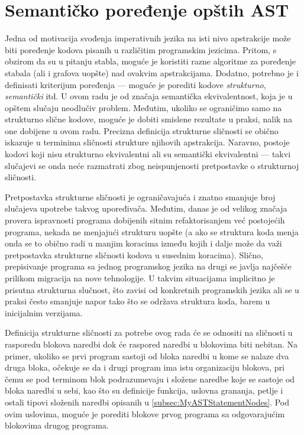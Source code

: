 \chapter{Semantičko poređenje opštih AST}
\label{chp:ASTComparing}

Jedna od motivacija svođenja imperativnih jezika na isti nivo apstrakcije može biti poređenje kodova pisanih u različitim programskim jezicima. Pritom, s obzirom da su u pitanju stabla, moguće je koristiti razne algoritme za poređenje stabala (ali i grafova uopšte) nad ovakvim apstrakcijama. Dodatno, potrebno je i definisati kriterijum poređenja --- moguće je porediti kodove \emph{strukturno}, \emph{semantički} itd. U ovom radu je od značaja semantička ekvivalentnost, koja je u opštem slučaju neodlučiv problem. Međutim, ukoliko se ograničimo samo na strukturno slične kodove, moguće je dobiti smislene rezultate u praksi, nalik na one dobijene u ovom radu. Precizna definicija strukturne sličnosti se obično iskazuje u terminima sličnosti strukture njihovih apstrakcija. Naravno, postoje kodovi koji nisu strukturno ekvivalentni ali su semantički ekvivalentni --- takvi slučajevi se onda neće razmatrati zbog neispunjenosti pretpostavke o strukturnoj sličnosti. 

Pretpostavka strukturne sličnosti je ograničavajuća i znatno smanjuje broj slučajeva upotrebe takvog upoređivača. Međutim, danas je od velikog značaja provera ispravnosti programa dobijenih sitnim refaktorisanjem već postojećih programa, nekada ne menjajući strukturu uopšte (a ako se struktura koda menja onda se to obično radi u manjim koracima između kojih i dalje može da važi pretpostavka strukturne sličnosti kodova u susednim koracima). Slično, prepisivanje programa sa jednog programskog jezika na drugi se javlja najčešće prilikom migracija na nove tehnologije. U takvim situacijama implicitno je prisutna strukturna slučnost, što zavisi od konkretnih programskih jezika ali se u praksi često smanjuje napor tako što se održava struktura koda, barem u inicijalnim verzijama. 

Definicija strukturne sličnosti za potrebe ovog rada će se odnositi na sličnosti u rasporedu blokova naredbi dok će raspored naredbi u blokovima biti nebitan. Na primer, ukoliko se prvi program sastoji od bloka naredbi u kome se nalaze dva druga bloka, očekuje se da i drugi program ima istu organizaciju blokova, pri čemu se pod terminom blok podrazumevaju i složene naredbe koje se sastoje od bloka naredbi u sebi, kao što su definicije funkcija, uslovna grananja, petlje i ostali tipovi složenih naredbi opisanih u \ref{subsec:MyASTStatementNodes}. Pod ovim uslovima, moguće je porediti blokove prvog programa sa odgovarajućim blokovima drugog programa.

